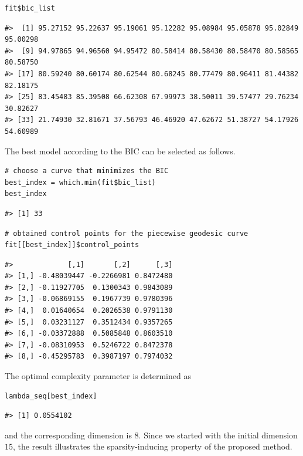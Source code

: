 \begin{verbatim}
fit$bic_list
\end{verbatim}

\begin{verbatim}
#>  [1] 95.27152 95.22637 95.19061 95.12282 95.08984 95.05878 95.02849 95.00298
#>  [9] 94.97865 94.96560 94.95472 80.58414 80.58430 80.58470 80.58565 80.58750
#> [17] 80.59240 80.60174 80.62544 80.68245 80.77479 80.96411 81.44382 82.18175
#> [25] 83.45483 85.39508 66.62308 67.99973 38.50011 39.57477 29.76234 30.82627
#> [33] 21.74930 32.81671 37.56793 46.46920 47.62672 51.38727 54.17926 54.60989
\end{verbatim}

The best model according to the BIC can be selected as follows.

\begin{verbatim}
# choose a curve that minimizes the BIC
best_index = which.min(fit$bic_list)
best_index
\end{verbatim}

\begin{verbatim}
#> [1] 33
\end{verbatim}

\begin{verbatim}
# obtained control points for the piecewise geodesic curve
fit[[best_index]]$control_points
\end{verbatim}

\begin{verbatim}
#>             [,1]       [,2]      [,3]
#> [1,] -0.48039447 -0.2266981 0.8472480
#> [2,] -0.11927705  0.1300343 0.9843089
#> [3,] -0.06869155  0.1967739 0.9780396
#> [4,]  0.01640654  0.2026538 0.9791130
#> [5,]  0.03231127  0.3512434 0.9357265
#> [6,] -0.03372888  0.5085848 0.8603510
#> [7,] -0.08310953  0.5246722 0.8472378
#> [8,] -0.45295783  0.3987197 0.7974032
\end{verbatim}

The optimal complexity parameter is determined as

\begin{verbatim}
lambda_seq[best_index]
\end{verbatim}

\begin{verbatim}
#> [1] 0.0554102
\end{verbatim}

\noindent and the corresponding dimension is \(8\). Since we started with the initial dimension \(15\), the result illustrates the sparsity-inducing property of the proposed method.

